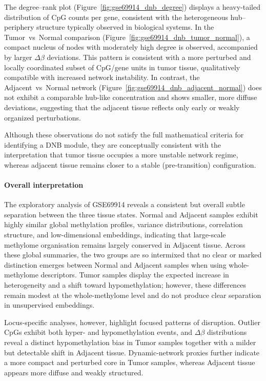 The degree–rank plot (Figure~\ref{fig:gse69914_dnb_degree}) displays a heavy-tailed distribution of CpG counts per gene, consistent with the heterogeneous hub–periphery structure typically observed in biological systems.
In the Tumor~vs~Normal comparison (Figure~\ref{fig:gse69914_dnb_tumor_normal}), a compact nucleus of nodes with moderately high degree is observed, accompanied by larger $\Delta\beta$ deviations.
This pattern is consistent with a more perturbed and locally coordinated subset of CpG/gene units in tumor tissue, qualitatively compatible with increased network instability.
In contrast, the Adjacent~vs~Normal network (Figure~\ref{fig:gse69914_dnb_adjacent_normal}) does not exhibit a comparable hub-like concentration and shows smaller, more diffuse deviations, suggesting that the adjacent tissue reflects only early or weakly organized perturbations.

Although these observations do not satisfy the full mathematical criteria for identifying a DNB module, they are conceptually consistent with the interpretation that tumor tissue occupies a more unstable network regime, whereas adjacent tissue remains closer to a stable (pre-transition) configuration.




\paragraph{Overall interpretation}

The exploratory analysis of GSE69914 reveals a consistent but overall subtle separation between the three tissue states. Normal and Adjacent samples exhibit highly similar global methylation profiles, variance distributions, correlation structure, and low-dimensional embeddings, indicating that large-scale methylome organisation remains largely conserved in Adjacent tissue. Across these global summaries, the two groups are so intermixed that no clear or marked distinction emerges between Normal and Adjacent samples when using whole-methylome descriptors. Tumor samples display the expected increase in heterogeneity and a shift toward hypomethylation; however, these differences remain modest at the whole-methylome level and do not produce clear separation in unsupervised embeddings.

Locus-specific analyses, however, highlight focused patterns of disruption. Outlier CpGs exhibit both hyper- and hypomethylation events, and $\Delta\beta$ distributions reveal a distinct hypomethylation bias in Tumor samples together with a milder but detectable shift in Adjacent tissue. Dynamic-network proxies further indicate a more compact and perturbed core in Tumor samples, whereas Adjacent tissue appears more diffuse and weakly structured.


